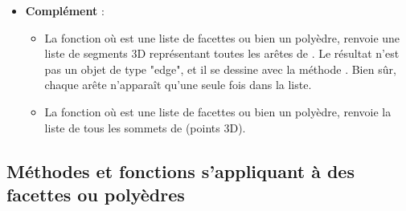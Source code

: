 \begin{itemize}
    \item \textbf{Complément} : 
        \begin{itemize}
            \item La fonction  où  est une liste de facettes ou bien un polyèdre, renvoie une liste de segments 3D représentant toutes les arêtes de . Le résultat n'est pas un objet de type "edge", et il se dessine avec la méthode . Bien sûr, chaque arête n'apparaît qu'une seule fois dans la liste.
            \item La fonction  où  est une liste de facettes ou bien un polyèdre, renvoie la liste de tous les sommets de  (points 3D).
        \end{itemize}
\end{itemize}

\subsection{Méthodes et fonctions s'appliquant à des facettes ou polyèdres}

